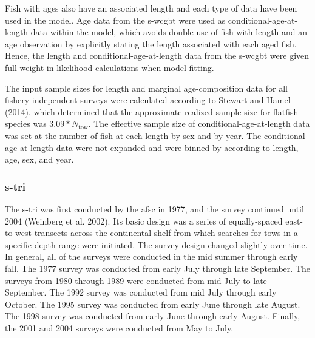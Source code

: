 \documentclass[11pt,
  english,
  a4paper,
]{article}
\begin{document}

Fish with ages also have an associated length and each type of data have been used in the model. Age data from the \gls{s-wcgbt} were used as conditional-age-at-length data within the model, which avoids double use of fish with length and an age observation by explicitly stating the length associated with each aged fish. Hence, the length and conditional-age-at-length data from the \gls{s-wcgbt} were given full weight in likelihood calculations when model fitting.

\leavevmode\tagmcend\tagstructend\par


The input sample sizes for length and marginal age-composition data for all fishery-independent surveys were calculated according to Stewart and Hamel {(2014)\leavevmode\tagmcend\tagstructend}, which determined that the approximate realized sample size for flatfish species was {\(3.09*N_{\text{tow}}\)\leavevmode\tagmcend\tagstructend}. The effective sample size of conditional-age-at-length data was set at the number of fish at each length by sex and by year. The conditional-age-at-length data were not expanded and were binned by according to length, age, sex, and year.

\leavevmode\tagmcend\tagstructend\par


\hypertarget{section}{%
\subsubsection{\texorpdfstring{\acrlong{s-tri}}{}}\label{section}}

\leavevmode\tagmcend\tagstructend


The \gls{s-tri} was first conducted by the \gls{afsc} in 1977, and the survey continued until 2004 {(Weinberg et al. 2002)\leavevmode\tagmcend\tagstructend}. Its basic design was a series of equally-spaced east-to-west transects across the continental shelf from which searches for tows in a specific depth range were initiated. The survey design changed slightly over time. In general, all of the surveys were conducted in the mid summer through early fall. The 1977 survey was conducted from early July through late September. The surveys from 1980 through 1989 were conducted from mid-July to late September. The 1992 survey was conducted from mid July through early October. The 1995 survey was conducted from early June through late August. The 1998 survey was conducted from early June through early August. Finally, the 2001 and 2004 surveys were conducted from May to July.
\end{document}
